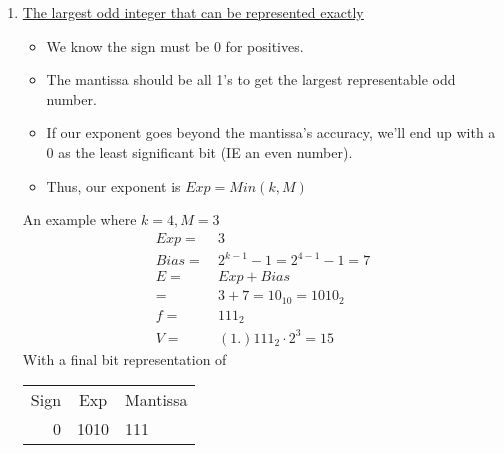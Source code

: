 \documentclass{article}
\begin{document}
\begin{enumerate}[label=\Alph*)]
    \item \underline{The largest odd integer that can be represented exactly}
    \begin{itemize}
        \item We know the sign must be 0 for positives.
        \item The mantissa should be all 1's to get the largest representable odd number.
        \item If our exponent goes beyond the mantissa's accuracy, we'll end up with a 0 as the least significant bit (IE an even number).
        \item Thus, our exponent is \(Exp = Min(k, M)\)
    \end{itemize}
    An example where \(k = 4, M = 3\)
    \begin{align*}
        Exp =&\ 3 \\
        Bias =&\ 2^{k-1} - 1 = 2^{4-1} - 1 = 7 \\
        E =&\ Exp + Bias \\
          =&\ 3 + 7 = 10_{10} = 1010_2 \\
        f =&\ 111_2 \\
        V =&\ (1.)111_2 \cdot 2^{3} = 15
    \end{align*}
    With a final bit representation of
    \begin{tabular}{r|c|l}
        Sign & Exp & Mantissa \\
        0 & 1010 & 111 \\
    \end{tabular} \\
    \pagebreak


\end{enumerate}
\end{document}
